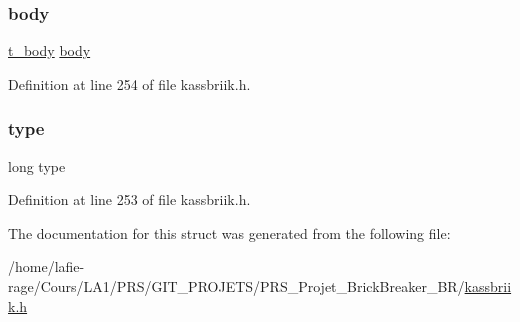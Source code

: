 \subsubsection{\texorpdfstring{body}{body}}
{\footnotesize\ttfamily \hyperlink{structt__body}{t\+\_\+body} \hyperlink{structbody}{body}}



Definition at line 254 of file kassbriik.\+h.

\mbox{\label{structrequest_a6a83a8677f7c78fd146859325e08209a}} 
\subsubsection{\texorpdfstring{type}{type}}
{\footnotesize\ttfamily long type}



Definition at line 253 of file kassbriik.\+h.



The documentation for this struct was generated from the following file\+:\begin{DoxyCompactItemize}
\item 
/home/lafie-\/rage/\+Cours/\+L\+A1/\+P\+R\+S/\+G\+I\+T\+\_\+\+P\+R\+O\+J\+E\+T\+S/\+P\+R\+S\+\_\+\+Projet\+\_\+\+Brick\+Breaker\+\_\+\+B\+R/\hyperlink{kassbriik_8h}{kassbriik.\+h}\end{DoxyCompactItemize}
